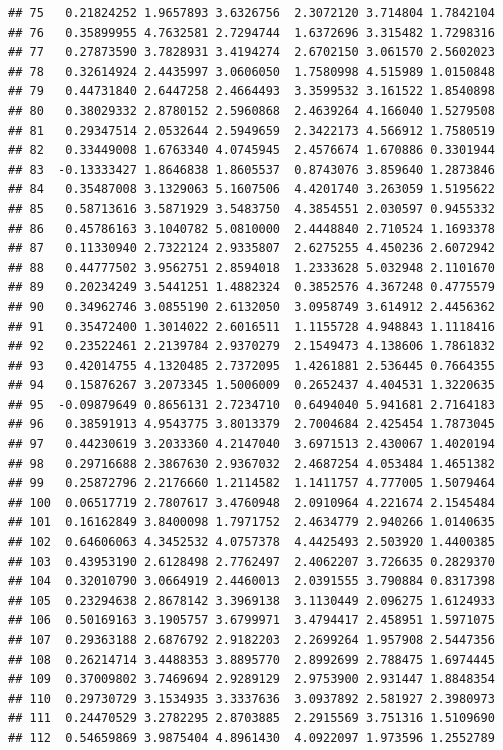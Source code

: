 \documentclass[
  11pt,
]{book}
\begin{document}
\begin{verbatim}
## 75   0.21824252 1.9657893 3.6326756  2.3072120 3.714804 1.7842104
## 76   0.35899955 4.7632581 2.7294744  1.6372696 3.315482 1.7298316
## 77   0.27873590 3.7828931 3.4194274  2.6702150 3.061570 2.5602023
## 78   0.32614924 2.4435997 3.0606050  1.7580998 4.515989 1.0150848
## 79   0.44731840 2.6447258 2.4664493  3.3599532 3.161522 1.8540898
## 80   0.38029332 2.8780152 2.5960868  2.4639264 4.166040 1.5279508
## 81   0.29347514 2.0532644 2.5949659  2.3422173 4.566912 1.7580519
## 82   0.33449008 1.6763340 4.0745945  2.4576674 1.670886 0.3301944
## 83  -0.13333427 1.8646838 1.8605537  0.8743076 3.859640 1.2873846
## 84   0.35487008 3.1329063 5.1607506  4.4201740 3.263059 1.5195622
## 85   0.58713616 3.5871929 3.5483750  4.3854551 2.030597 0.9455332
## 86   0.45786163 3.1040782 5.0810000  2.4448840 2.710524 1.1693378
## 87   0.11330940 2.7322124 2.9335807  2.6275255 4.450236 2.6072942
## 88   0.44777502 3.9562751 2.8594018  1.2333628 5.032948 2.1101670
## 89   0.20234249 3.5441251 1.4882324  0.3852576 4.367248 0.4775579
## 90   0.34962746 3.0855190 2.6132050  3.0958749 3.614912 2.4456362
## 91   0.35472400 1.3014022 2.6016511  1.1155728 4.948843 1.1118416
## 92   0.23522461 2.2139784 2.9370279  2.1549473 4.138606 1.7861832
## 93   0.42014755 4.1320485 2.7372095  1.4261881 2.536445 0.7664355
## 94   0.15876267 3.2073345 1.5006009  0.2652437 4.404531 1.3220635
## 95  -0.09879649 0.8656131 2.7234710  0.6494040 5.941681 2.7164183
## 96   0.38591913 4.9543775 3.8013379  2.7004684 2.425454 1.7873045
## 97   0.44230619 3.2033360 4.2147040  3.6971513 2.430067 1.4020194
## 98   0.29716688 2.3867630 2.9367032  2.4687254 4.053484 1.4651382
## 99   0.25872796 2.2176660 1.2114582  1.1411757 4.777005 1.5079464
## 100  0.06517719 2.7807617 3.4760948  2.0910964 4.221674 2.1545484
## 101  0.16162849 3.8400098 1.7971752  2.4634779 2.940266 1.0140635
## 102  0.64606063 4.3452532 4.0757378  4.4425493 2.503920 1.4400385
## 103  0.43953190 2.6128498 2.7762497  2.4062207 3.726635 0.2829370
## 104  0.32010790 3.0664919 2.4460013  2.0391555 3.790884 0.8317398
## 105  0.23294638 2.8678142 3.3969138  3.1130449 2.096275 1.6124933
## 106  0.50169163 3.1905757 3.6799971  3.4794417 2.458951 1.5971075
## 107  0.29363188 2.6876792 2.9182203  2.2699264 1.957908 2.5447356
## 108  0.26214714 3.4488353 3.8895770  2.8992699 2.788475 1.6974445
## 109  0.37009802 3.7469694 2.9289129  2.9753900 2.931447 1.8848354
## 110  0.29730729 3.1534935 3.3337636  3.0937892 2.581927 2.3980973
## 111  0.24470529 3.2782295 2.8703885  2.2915569 3.751316 1.5109690
## 112  0.54659869 3.9875404 4.8961430  4.0922097 1.973596 1.2552789

\end{verbatim}
\end{document}
